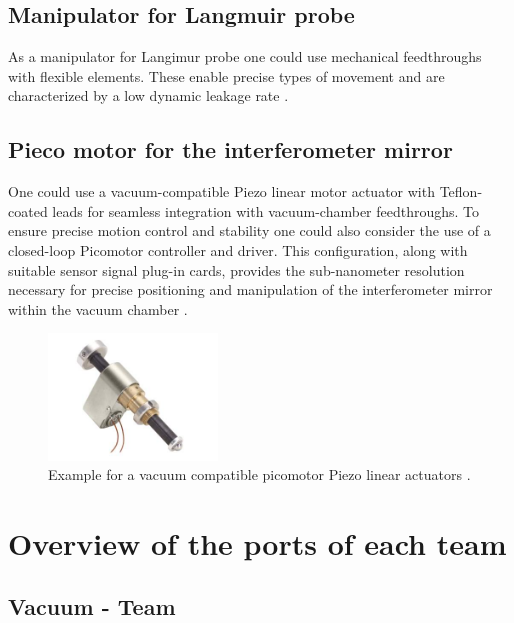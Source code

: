 \subsection{Manipulator for Langmuir probe}

As a manipulator for Langimur probe one could use mechanical feedthroughs with flexible elements. These enable precise types of movement and are characterized by a low dynamic leakage rate \cite{jousten_handbuch_2018}.

\subsection{Pieco motor for the interferometer mirror}

One could use a vacuum-compatible Piezo linear motor actuator with Teflon-coated leads for seamless integration with vacuum-chamber feedthroughs.
To ensure precise motion control and stability one could also consider the use of a closed-loop Picomotor controller and driver.
This configuration, along with suitable sensor signal plug-in cards, provides the sub-nanometer resolution necessary for precise positioning and manipulation of the interferometer mirror within the vacuum chamber \cite{pie, piez0}.


\begin{figure}[H]
    \centering
    \includegraphics[width=0.4\textwidth]{sections/imges/piezo.jpg}
    \caption{Example for a vacuum compatible picomotor Piezo linear actuators \cite{pie}.}
    \label{fig:pie}
\end{figure}




\section{Overview of the ports of each team}

\subsection{Vacuum - Team}




